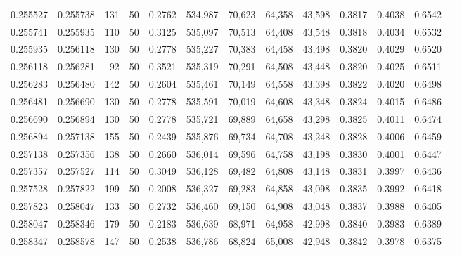 \begin{tabular}{rrrrrrrrrrrrr}
0.255527 & 0.255738 &   131 &  50 &                                     0.2762 & 534,987 &  70,623 &  64,358 &  43,598 & 0.3817 & 0.4038 & 0.6542 \\
0.255741 & 0.255935 &   110 &  50 &                                     0.3125 & 535,097 &  70,513 &  64,408 &  43,548 & 0.3818 & 0.4034 & 0.6532 \\
0.255935 & 0.256118 &   130 &  50 &                                     0.2778 & 535,227 &  70,383 &  64,458 &  43,498 & 0.3820 & 0.4029 & 0.6520 \\
0.256118 & 0.256281 &    92 &  50 &                                     0.3521 & 535,319 &  70,291 &  64,508 &  43,448 & 0.3820 & 0.4025 & 0.6511 \\
0.256283 & 0.256480 &   142 &  50 &                                     0.2604 & 535,461 &  70,149 &  64,558 &  43,398 & 0.3822 & 0.4020 & 0.6498 \\
0.256481 & 0.256690 &   130 &  50 &                                     0.2778 & 535,591 &  70,019 &  64,608 &  43,348 & 0.3824 & 0.4015 & 0.6486 \\
0.256690 & 0.256894 &   130 &  50 &                                     0.2778 & 535,721 &  69,889 &  64,658 &  43,298 & 0.3825 & 0.4011 & 0.6474 \\
0.256894 & 0.257138 &   155 &  50 &                                     0.2439 & 535,876 &  69,734 &  64,708 &  43,248 & 0.3828 & 0.4006 & 0.6459 \\
0.257138 & 0.257356 &   138 &  50 &                                     0.2660 & 536,014 &  69,596 &  64,758 &  43,198 & 0.3830 & 0.4001 & 0.6447 \\
0.257357 & 0.257527 &   114 &  50 &                                     0.3049 & 536,128 &  69,482 &  64,808 &  43,148 & 0.3831 & 0.3997 & 0.6436 \\
0.257528 & 0.257822 &   199 &  50 &                                     0.2008 & 536,327 &  69,283 &  64,858 &  43,098 & 0.3835 & 0.3992 & 0.6418 \\
0.257823 & 0.258047 &   133 &  50 &                                     0.2732 & 536,460 &  69,150 &  64,908 &  43,048 & 0.3837 & 0.3988 & 0.6405 \\
0.258047 & 0.258346 &   179 &  50 &                                     0.2183 & 536,639 &  68,971 &  64,958 &  42,998 & 0.3840 & 0.3983 & 0.6389 \\
0.258347 & 0.258578 &   147 &  50 &                                     0.2538 & 536,786 &  68,824 &  65,008 &  42,948 & 0.3842 & 0.3978 & 0.6375 \\

\end{tabular}
